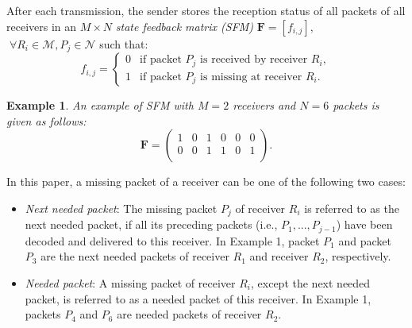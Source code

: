 \documentclass[12pt, peerreview, onecolumn]{IEEEtran}
\begin{document}
After each transmission,  the sender stores the reception  status of all packets of all receivers in an $ M\times N $  \emph{state feedback matrix (SFM)} $\mathbf{F} = [f_{i,j}],$ $\; \forall R_i  \in \mathcal{M}, P_j\in \mathcal{N}$ such that:
 \begin{equation}
  f_{i,j} =
   \begin{cases}
    0 & \text{if packet $P_j$ is received by receiver $R_i$}, \\
    1 & \text{if packet $P_j$ is missing at receiver $R_i$}.
   \end{cases}
 \end{equation}

\newtheorem{examples}{\textbf{Example}}
\begin{examples}
An example of SFM with $M = 2$ receivers and $N = 6$ packets is given as follows:
\begin{equation} \label{largeSFM1}
\mathbf{F} = \begin{pmatrix}
  1 & 0 & 1 & 0 & 0 & 0 \\
  0 & 0 & 1 & 1 & 0 & 1\\
\end{pmatrix}.
\end{equation}
\end{examples}

In this paper, a missing packet of a receiver can be one of the following two cases:
\begin{itemize}
\item \emph{Next needed packet}: The missing packet $P_j$  of receiver  $R_i$ is referred to as the next needed packet, if all its preceding packets  (i.e., $P_1,...,P_{j-1}$) have been decoded and delivered to this receiver. In Example 1, packet $P_1$ and  packet $P_3$ are  the next needed packets of receiver $R_1$ and receiver $R_2$, respectively.
\item \emph{Needed packet}: A missing packet of receiver $R_i$, except the next needed packet, is referred to  as a needed packet of this receiver. In Example 1, packets $P_4$ and $P_6$ are needed packets of receiver  $R_2$.
\end{itemize}
\end{document}
